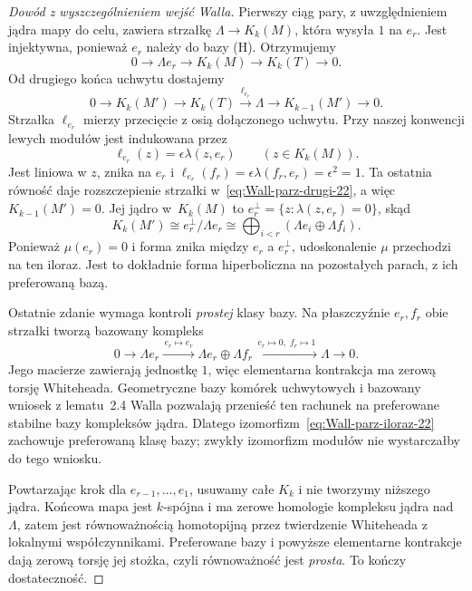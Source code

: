 \begin{proof}[Dowód z wyszczególnieniem wejść Walla]
Pierwszy ciąg pary, z uwzględnieniem jądra mapy
do celu, zawiera strzałkę $\Lambda\to K_k(M)$,
która wysyła $1$ na $e_r$. Jest injektywna,
ponieważ $e_r$ należy do bazy (H). Otrzymujemy
\begin{equation}\label{eq:Wall-parz-pierwszy-22}
 0\longrightarrow\Lambda e_r\longrightarrow K_k(M)
  \longrightarrow K_k(T)\longrightarrow0.
\end{equation}
Od drugiego końca uchwytu dostajemy
\begin{equation}\label{eq:Wall-parz-drugi-22}
 0\longrightarrow K_k(M')\longrightarrow K_k(T)
  \xrightarrow{\,\ell_{e_r}\,}\Lambda
  \longrightarrow K_{k-1}(M')\longrightarrow0.
\end{equation}
Strzałka $\ell_{e_r}$ mierzy przecięcie z osią
dołączonego uchwytu. Przy naszej konwencji lewych
modułów jest indukowana przez
\[
 \ell_{e_r}(z)=\epsilon\lambda(z,e_r)
 \qquad(z\in K_k(M)).
\]
Jest liniowa w $z$, znika na $e_r$ i
$\ell_{e_r}(f_r)=
\epsilon\lambda(f_r,e_r)=\epsilon^2=1$.
Ta ostatnia równość daje rozszczepienie strzałki
w~\eqref{eq:Wall-parz-drugi-22}, a więc
$K_{k-1}(M')=0$. Jej jądro w~$K_k(M)$ to
$e_r^\perp=\{z:\lambda(z,e_r)=0\}$, skąd
\begin{equation}\label{eq:Wall-parz-iloraz-22}
 K_k(M')\cong e_r^\perp/\Lambda e_r
   \cong\bigoplus_{i<r}(\Lambda e_i\oplus\Lambda f_i).
\end{equation}
Ponieważ $\mu(e_r)=0$ i forma znika między
$e_r$ a $e_r^\perp$, udoskonalenie $\mu$
przechodzi na ten iloraz. Jest to dokładnie forma
hiperboliczna na pozostałych parach, z ich
preferowaną bazą.

Ostatnie zdanie wymaga kontroli \emph{prostej}
klasy bazy. Na płaszczyźnie $e_r,f_r$ obie
strzałki tworzą bazowany kompleks
\[
 0\longrightarrow\Lambda e_r
 \xrightarrow{\,e_r\mapsto e_r\,}
 \Lambda e_r\oplus\Lambda f_r
 \xrightarrow{\,e_r\mapsto0,\;f_r\mapsto1\,}
 \Lambda\longrightarrow0.
\]
Jego macierze zawierają jednostkę $1$, więc
elementarna kontrakcja ma zerową torsję
Whiteheada. Geometryczne bazy komórek uchwytowych
i bazowany wniosek z lematu~2.4 Walla pozwalają
przenieść ten rachunek na preferowane stabilne
bazy kompleksów jądra.
Dlatego izomorfizm~\eqref{eq:Wall-parz-iloraz-22}
zachowuje preferowaną klasę bazy; zwykły
izomorfizm modułów nie wystarczałby do tego wniosku.

Powtarzając krok dla $e_{r-1},\ldots,e_1$,
usuwamy całe $K_k$ i nie tworzymy niższego jądra.
Końcowa mapa jest $k$-spójna i ma zerowe homologie
kompleksu jądra nad $\Lambda$, zatem jest
równoważnością homotopijną przez twierdzenie
Whiteheada z lokalnymi współczynnikami.
Preferowane bazy i powyższe elementarne kontrakcje
dają zerową torsję jej stożka, czyli równoważność
jest \emph{prosta}. To kończy dostateczność.


\end{proof}
